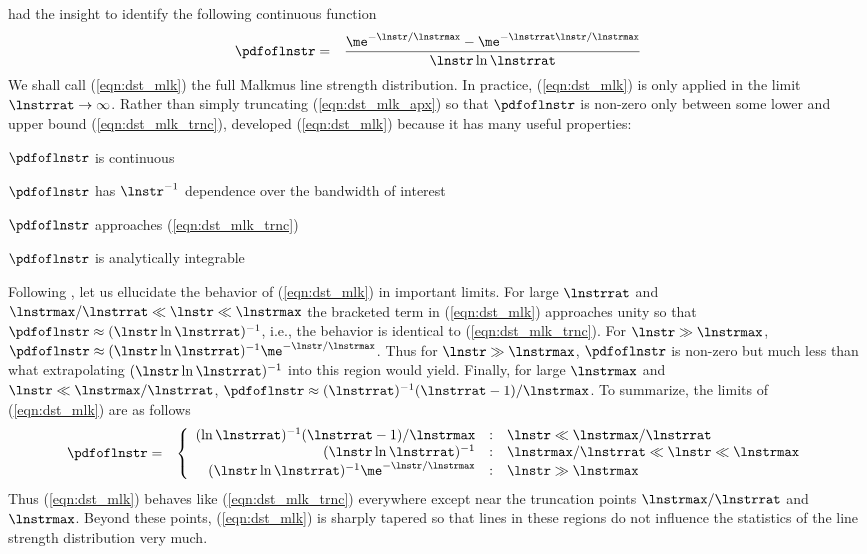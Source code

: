 \documentclass[12pt]{article}
\begin{document}
\cite{Mal67} had the insight to identify the following continuous
function
\begin{eqnarray}
\pdfoflnstr & = & 
\frac{\me^{-\lnstr/\lnstrmax} - \me^{-\lnstrrat \lnstr / \lnstrmax }}
{\lnstr \ln \lnstrrat} 
\label{eqn:dst_mlk}
\end{eqnarray}
We shall call (\ref{eqn:dst_mlk}) the full Malkmus line strength
distribution. 
In practice, (\ref{eqn:dst_mlk}) is only applied in the limit
$\lnstrrat \rightarrow \infty$.
Rather than simply truncating (\ref{eqn:dst_mlk_apx}) so that
$\pdfoflnstr$ is non-zero only between some lower and upper bound
(\ref{eqn:dst_mlk_trnc}), \cite{Mal67} developed (\ref{eqn:dst_mlk})
because it has many useful properties:
\begin{enumerate*}
\item $\pdfoflnstr$ is continuous
\item $\pdfoflnstr$ has $\lnstr^{-1}$ dependence over the bandwidth of
interest
\item $\pdfoflnstr$ approaches (\ref{eqn:dst_mlk_trnc})
\item $\pdfoflnstr$ is analytically integrable
\end{enumerate*}

Following \cite{Mal67}, let us ellucidate the behavior of
(\ref{eqn:dst_mlk}) in important limits. 
For large $\lnstrrat$ and 
$\lnstrmax/\lnstrrat \ll \lnstr \ll \lnstrmax$ the 
bracketed term in (\ref{eqn:dst_mlk}) approaches unity so that
$\pdfoflnstr \approx (\lnstr \ln \lnstrrat)^{-1}$, i.e.,
the behavior is identical to (\ref{eqn:dst_mlk_trnc}).
For $\lnstr \gg \lnstrmax$, 
$\pdfoflnstr \approx (\lnstr \ln \lnstrrat)^{-1}
\me^{-\lnstr/\lnstrmax}$. 
Thus for $\lnstr \gg \lnstrmax$, $\pdfoflnstr$ is non-zero but much
less than what extrapolating $(\lnstr \ln \lnstrrat)^{-1}$ into this 
region would yield.
Finally, for large $\lnstrmax$ and $\lnstr \ll \lnstrmax/\lnstrrat$,  
$\pdfoflnstr \approx (\lnstrrat)^{-1}(\lnstrrat -1)/\lnstrmax$.
To summarize, the limits of (\ref{eqn:dst_mlk}) are as follows
\begin{eqnarray}
\pdfoflnstr & = & \left\{
\begin{array}{r@{\quad:\quad}ll}
(\ln \lnstrrat)^{-1}(\lnstrrat -1)/\lnstrmax
& \lnstr \ll \lnstrmax/\lnstrrat \\
(\lnstr \ln \lnstrrat)^{-1} 
& \lnstrmax/\lnstrrat \ll \lnstr \ll \lnstrmax \\
(\lnstr \ln \lnstrrat)^{-1} \me^{-\lnstr/\lnstrmax} 
& \lnstr \gg \lnstrmax \\
\end{array} \right.
\label{eqn:dst_mlk_lmt}
\end{eqnarray}
Thus (\ref{eqn:dst_mlk}) behaves like (\ref{eqn:dst_mlk_trnc})
everywhere except near the truncation points $\lnstrmax/\lnstrrat$ 
and $\lnstrmax$.
Beyond these points, (\ref{eqn:dst_mlk}) is sharply tapered so that
lines in these regions do not influence the statistics of the line
strength distribution very much.
\end{document}
